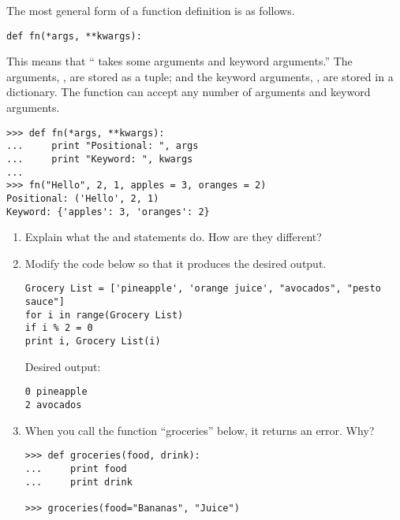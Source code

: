 The most general form of a function definition is as follows.
\begin{lstlisting}
def fn(*args, **kwargs):
\end{lstlisting}
This means that `` takes some arguments and keyword arguments.''
The arguments, , are stored as a tuple; and the keyword arguments, , are stored in a dictionary.
The function  can accept any number of arguments and keyword arguments.
\begin{lstlisting}
>>> def fn(*args, **kwargs):
...     print "Positional: ", args
...     print "Keyword: ", kwargs
...     
>>> fn("Hello", 2, 1, apples = 3, oranges = 2)
Positional: ('Hello', 2, 1)
Keyword: {'apples': 3, 'oranges': 2}
\end{lstlisting}

\begin{problem}

\begin{enumerate}
\item Explain what the  and  statements do. How are they different?
\item Modify the code below so that it produces the desired output.
\begin{lstlisting}
Grocery List = ['pineapple', 'orange juice', "avocados", "pesto sauce"]
for i in range(Grocery List)
if i % 2 = 0
print i, Grocery List(i)
\end{lstlisting}
Desired output:
\begin{lstlisting}
0 pineapple
2 avocados
\end{lstlisting}
\item When you call the function ``groceries'' below, it returns an error. Why?
\begin{lstlisting}
>>> def groceries(food, drink):
...     print food
...     print drink    

>>> groceries(food="Bananas", "Juice")
\end{lstlisting}
\end{enumerate}
\end{problem}


\begin{comment}
\section*{Specifications}
We suggest that you submit your solutions in a file called \li{solutions.py}, using the following format.

\end{comment}
